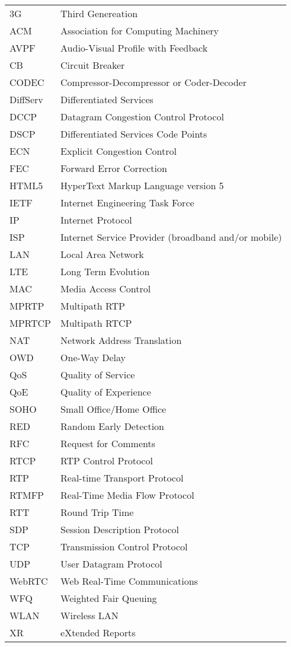 \begin{longtable}{ll}
3G		& Third Genereation \\
ACM 	& Association for Computing Machinery \\
AVPF	& Audio-Visual Profile with Feedback \\
CB		& Circuit Breaker \\
CODEC	& Compressor-Decompressor or Coder-Decoder \\
DiffServ	& Differentiated Services \\
DCCP 	& Datagram Congestion Control Protocol \\
DSCP 	& Differentiated Services Code Points \\
ECN		& Explicit Congestion Control \\
FEC		& Forward Error Correction \\
HTML5	& HyperText Markup Language version 5\\
IETF	& Internet Engineering Task Force \\
IP		& Internet Protocol \\
ISP 	& Internet Service Provider (broadband and/or mobile)\\
LAN 	& Local Area Network \\
LTE 	& Long Term Evolution \\
MAC 	& Media Access Control \\
MPRTP 	& Multipath RTP \\
MPRTCP	& Multipath RTCP \\
NAT 	& Network Address Translation \\
OWD 	& One-Way Delay \\
QoS 	& Quality of Service \\
QoE 	& Quality of Experience \\
SOHO 	& Small Office/Home Office \\
RED 	& Random Early Detection \\
RFC 	& Request for Comments \\
RTCP 	& RTP Control Protocol \\
RTP 	& Real-time Transport Protocol \\
RTMFP	& Real-Time Media Flow Protocol \\
RTT 	& Round Trip Time \\
SDP 	& Session Description Protocol \\
TCP 	& Transmission Control Protocol \\
UDP 	& User Datagram Protocol \\
WebRTC	& Web Real-Time Communications \\
WFQ 	& Weighted Fair Queuing \\
WLAN	& Wireless LAN \\
XR		& eXtended Reports \\
\end{longtable}
